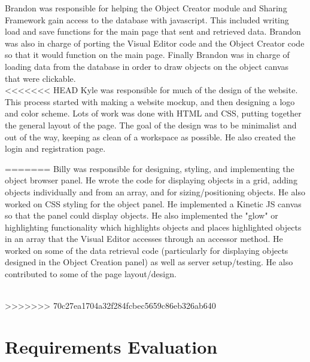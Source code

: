 \documentclass[12pt]{article}
\begin{document}
Brandon was responsible for helping the Object Creator module and Sharing Framework gain access to the database with javascript.  This included writing load and save functions for the main page that sent and retrieved data.  Brandon was also in charge of porting the Visual Editor code and the Object Creator code so that it would function on the main page.  Finally Brandon was in charge of loading data from the database in order to draw objects on the object canvas that were clickable.  \\

<<<<<<< HEAD
Kyle was responsible for much of the design of the website. This process started with making a website mockup, and then designing a logo and color scheme. Lots of work was done with HTML and CSS, putting together the general layout of the page. The goal of the design was to be minimalist and out of the way, keeping as clean of a workspace as possible. He also created the login and registration page.


=======
Billy was responsible for designing, styling, and implementing the object browser panel. He wrote the code for displaying objects in a grid, adding objects individually and from an array, and for sizing/positioning objects. He also worked on CSS styling for the object panel. He implemented a Kinetic JS canvas so that the panel could display objects. He also implemented the "glow" or highlighting functionality which highlights objects and places highlighted objects in an array that the Visual Editor accesses through an accessor method. He worked on some of the data retrieval code (particularly for displaying objects designed in the Object Creation panel) as well as server setup/testing. He also contributed to some of the page layout/design.

\\
>>>>>>> 70c27ea1704a32f284fcbec5659c86eb326ab640


\section{Requirements Evaluation}
\end{document}
